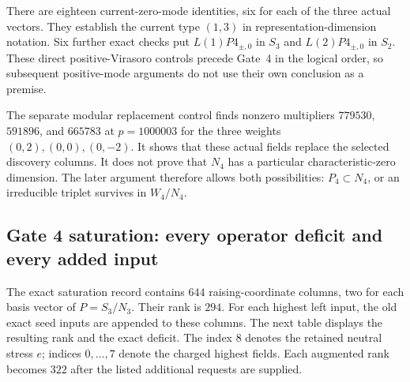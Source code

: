 There are eighteen current-zero-mode identities, six for each of the
three actual vectors. They establish the current type $(1,3)$ in
representation-dimension notation. Six further exact checks put
$L(1)P4_{\pm,0}$ in $S_3$ and $L(2)P4_{\pm,0}$ in $S_2$.
These direct positive-Virasoro controls precede Gate~4 in the logical
order, so subsequent positive-mode arguments do not use their own
conclusion as a premise.

The separate modular replacement control finds nonzero multipliers
$779530$, $591896$, and $665783$ at $p=1000003$ for the three
weights $(0,2),(0,0),(0,-2)$. It shows that these actual fields replace
the selected discovery columns. It does not prove that $N_4$ has a
particular characteristic-zero dimension. The later argument therefore
allows both possibilities: $P_4\subset N_4$, or an irreducible triplet
survives in $W_4/N_4$.

\subsection{Gate 4 saturation: every operator deficit and every added input}
\label{expfinite:gate4-inventory}

The exact saturation record contains $644$ raising-coordinate columns,
two for each basis vector of $P=S_3/N_3$. Their rank is $294$.
For each highest left input, the old exact seed inputs are appended to
these columns. The next table displays the resulting rank and the exact
deficit. The index $8$ denotes the retained neutral stress $e$; indices
$0,\ldots,7$ denote the charged highest fields. Each augmented rank
becomes $322$ after the listed additional requests are supplied.

